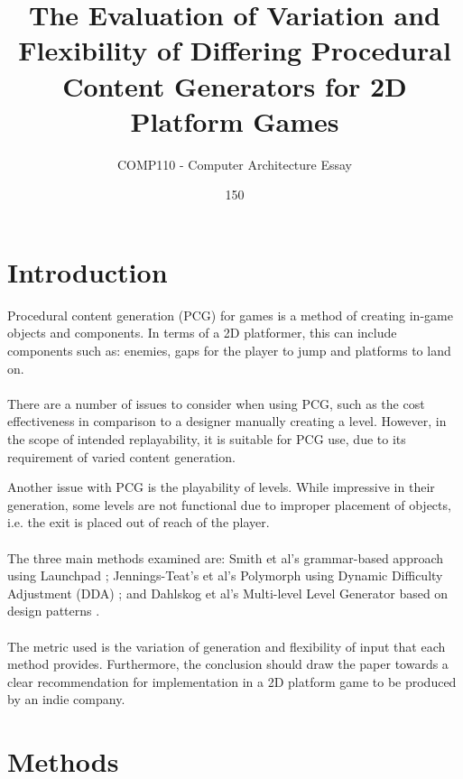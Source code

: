 \documentclass{scrartcl}
\title{The Evaluation of Variation and Flexibility of Differing Procedural Content Generators for 2D Platform Games}
\subtitle{COMP110 - Computer Architecture Essay}
\author{150}
\begin{document}
\maketitle


\section{Introduction}

Procedural content generation (PCG) for games is a method of creating in-game objects and components. In terms of a 2D platformer, this can include components such as: enemies, gaps for the player to jump and platforms to land on. \\ \\
There are a number of issues to consider when using PCG, such as the cost effectiveness in comparison to a designer manually creating a level. However, in the scope of intended replayability, it is suitable for PCG use, due to its requirement of varied content generation.

Another issue with PCG is the playability of levels. While impressive in their generation, some levels are not functional due to improper placement of objects, i.e. the exit is placed out of reach of the player. \\ \\
The three main methods examined are: Smith et al's grammar-based approach using Launchpad \cite{Smith2011} ; Jennings-Teat’s et al's Polymorph using Dynamic Difficulty Adjustment (DDA) \cite{Jennings2010:Model} ; and Dahlskog et al's Multi-level Level Generator based on design patterns \cite{Dahlskog2014}.\\ \\
The metric used is the variation of generation and flexibility of input that each method provides. Furthermore, the conclusion should draw the paper towards a clear recommendation for implementation in a 2D platform game to be produced by an indie company.

\section{Methods}
\end{document}
